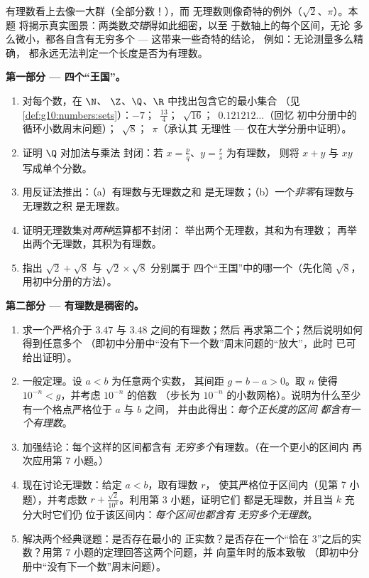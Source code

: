 \begin{problem}
\label{pb:g10:numbers:1}
有理数看上去像一大群（全部分数！），而
无理数则像奇特的例外（$\sqrt2$、$\pi$）。本题
将揭示真实图景：两类数\emph{交错}得如此细密，以至
于数轴上的每个区间，无论
多么微小，都各自含有无穷多个 --- 这带来一些奇特的结论，
例如：无论测量多么精确，
都永远无法判定一个长度是否为有理数。

\medskip
\noindent\textbf{第一部分 --- 四个“王国”。}
\begin{enumerate}
  \item 对每个数，在 $\N$、
        $\Z$、$\Q$、$\R$ 中找出包含它的最小集合
        （见\cref{def:g10:numbers:sets}）：$-7$；\ $\frac{13}{4}$；\
        $\sqrt{16}$；\ $0.121212\ldots$（回忆
        初中分册中的循环小数周末问题）；\ $\sqrt8$；\ $\pi$（承认其
        无理性 ---
        仅在大学分册中证明）。
  \item 证明 $\Q$ 对加法与乘法
        封闭：若 $x = \frac pq$、$y = \frac rs$ 为有理数，
        则将 $x + y$ 与 $xy$ 写成单个分数。
  \item 用反证法推出：（a）有理数与无理数之和
        是无理数；（b）一个\emph{非零}有理数与无理数之积
        是无理数。
  \item 证明无理数集对\emph{两种}运算都不封闭：
        举出两个无理数，其和为有理数；
        再举出两个无理数，其积为有理数。
  \item 指出 $\sqrt2 + \sqrt8$ 与 $\sqrt2 \times \sqrt8$ 分别属于
        四个“王国”中的哪一个（先化简 $\sqrt8$，
        用初中分册的方法）。
\end{enumerate}

\medskip
\noindent\textbf{第二部分 --- 有理数是稠密的。}
\begin{enumerate}[resume]
  \item 求一个严格介于 $3.47$ 与 $3.48$ 之间的有理数；然后
        再求第二个；然后说明如何得到任意多个
        （即初中分册中“没有下一个数”周末问题的“放大”，此时
        已可给出证明）。
  \item 一般定理。设 $a < b$ 为任意两个实数，
        其间距 $g = b - a > 0$。取 $n$ 使得
        $10^{-n} < g$，并考虑 $10^{-n}$ 的倍数
        （步长为 $10^{-n}$ 的小数网格）。说明为什么至少
        有一个格点严格位于 $a$ 与 $b$ 之间，
        并由此得出：\emph{每个正长度的区间
        都含有一个有理数}。
  \item 加强结论：每个这样的区间都含有
        \emph{无穷多个}有理数。（在一个更小的区间内
        再次应用第 7 小题。）
  \item 现在讨论无理数：给定 $a < b$，取有理数 $r$，
        使其严格位于区间内（见第 7 小题），并考虑数
        $r + \frac{\sqrt2}{10^k}$。利用第 3 小题，证明它们
        都是无理数，并且当 $k$ 充分大时它们仍
        位于该区间内：\emph{每个区间也都含有
        无穷多个无理数}。
  \item 解决两个经典谜题：是否存在最小的
        正实数？是否存在一个“恰在
        $3$”之后的实数？用第 7 小题的定理回答这两个问题，并
        向童年时的版本致敬
        （即初中分册中“没有下一个数”周末问题）。
\end{enumerate}


\end{problem}
